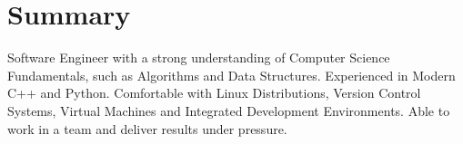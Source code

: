 \section{Summary}

\begin{cventries}
    \cventryi
        {Software Engineer with a strong understanding of Computer Science Fundamentals, such as  Algorithms and Data Structures. Experienced in Modern C++ and Python. Comfortable with Linux Distributions, Version Control Systems, Virtual Machines and Integrated Development Environments. Able to work in a team and deliver results under pressure.}
\end{cventries}
